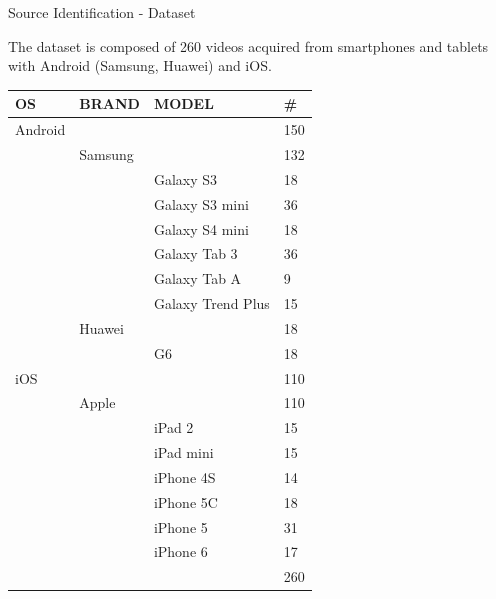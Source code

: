 \begin{tframe}{Source Identification - Dataset}

The dataset is composed of 260 videos acquired from smartphones and tablets with Android (Samsung, Huawei) and iOS.

\begin{tiny}
\begin{table}[]
\centering
\begin{tabular}{|l|l|l|l|}
\hline
\textbf{OS}       & \textbf{BRAND}    & \textbf{MODEL}             & \textbf{\#}			 \\ \hline
Android &         &                   & 150         \\ \hline
        & Samsung &                   & 132         \\ \hline
        &         & Galaxy S3         & 18          \\ \hline
        &         & Galaxy S3 mini    & 36          \\ \hline
        &         & Galaxy S4 mini    & 18          \\ \hline
        &         & Galaxy Tab 3      & 36          \\ \hline
        &         & Galaxy Tab A      & 9           \\ \hline
        &         & Galaxy Trend Plus & 15          \\ \hline
        & Huawei  &                   & 18          \\ \hline
        &         & G6                & 18          \\ \hline
iOS     &         &                   & 110         \\ \hline
        & Apple   &                   & 110         \\ \hline
        &         & iPad 2            & 15          \\ \hline
        &         & iPad mini         & 15          \\ \hline
        &         & iPhone 4S         & 14          \\ \hline
        &         & iPhone 5C         & 18          \\ \hline
        &         & iPhone 5          & 31          \\ \hline
        &         & iPhone 6          & 17          \\ \hline
        &         &                   & 260         \\ \hline

\end{tabular}
\end{table}
\end{tiny}

\end{tframe}

